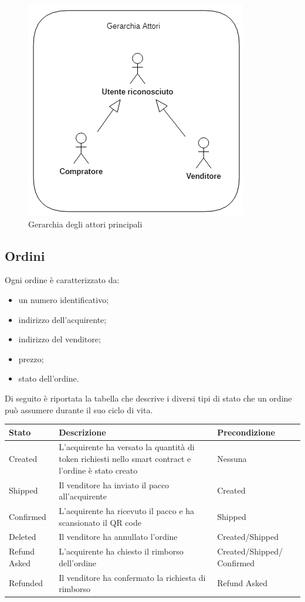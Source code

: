 \newpage

\begin{figure}[!h] 
    \centering 
    \includegraphics[width=0.6\columnwidth]{immagini/usecase/GerarchiaAttori.png} 
    \caption{Gerarchia degli attori principali}
\end{figure}

\subsection{Ordini}
Ogni ordine è caratterizzato da:
\begin{itemize}
    \item un numero identificativo;
    \item indirizzo dell'acquirente;
    \item indirizzo del venditore;
    \item prezzo;
    \item stato dell'ordine.
\end{itemize}

Di seguito è riportata la tabella che descrive i diversi tipi di stato che un ordine può assumere durante il suo ciclo di vita.

\begin{longtable}[c]{|l|p{7cm}|p{3cm}|}
\hline
\textbf{Stato} & \textbf{Descrizione} & \textbf{Precondizione}  \\ \hline
\endhead

Created & L'acquirente ha versato la quantità di token richiesti nello smart contract e l'ordine è stato creato & Nessuna \\ \hline
Shipped & Il venditore ha inviato il pacco all'acquirente & Created \\ \hline
Confirmed & L'acquirente ha ricevuto il pacco e ha scansionato il QR code & Shipped \\ \hline
Deleted & Il venditore ha annullato l'ordine & Created/Shipped \\ \hline
Refund Asked & L'acquirente ha chiesto il rimborso dell'ordine & Created/Shipped/ Confirmed \\ \hline
Refunded & Il venditore ha confermato la richiesta di rimborso & Refund Asked \\ \hline
\end{longtable}

